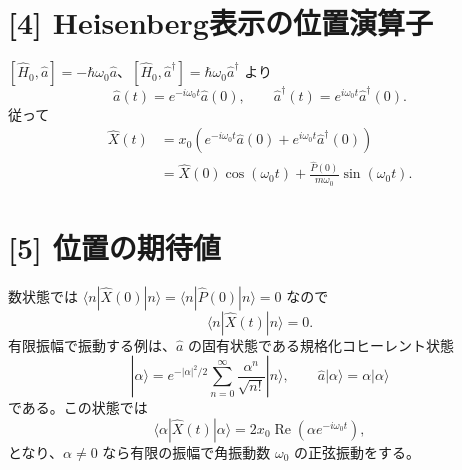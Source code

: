\documentclass[11pt,a4paper]{article}
\begin{document}
\section*{[4] Heisenberg表示の位置演算子}
$[\hat H_0,\hat a]=-\hbar\omega_0\hat a$、$[\hat H_0,\hat a^\dagger]=\hbar\omega_0\hat a^\dagger$ より
\begin{equation}
  \hat a(t)=e^{-i\omega_0t}\hat a(0),\qquad
  \hat a^\dagger(t)=e^{i\omega_0t}\hat a^\dagger(0).
\end{equation}
従って
\begin{align}
  \hat X(t)
  &=x_0\left(e^{-i\omega_0t}\hat a(0)
           +e^{i\omega_0t}\hat a^\dagger(0)\right)\\
  &=\boxed{\hat X(0)\cos(\omega_0t)
      +\frac{\hat P(0)}{m\omega_0}\sin(\omega_0t).}
\end{align}

\section*{[5] 位置の期待値}
数状態では $\langle n|\hat X(0)|n\rangle=\langle n|\hat P(0)|n\rangle=0$ なので
\begin{equation}
  \boxed{\langle n|\hat X(t)|n\rangle=0.}
\end{equation}
有限振幅で振動する例は、$\hat a$ の固有状態である規格化コヒーレント状態
\begin{equation}
  |\alpha\rangle=e^{-|\alpha|^2/2}
  \sum_{n=0}^{\infty}\frac{\alpha^n}{\sqrt{n!}}|n\rangle,
  \qquad \hat a|\alpha\rangle=\alpha|\alpha\rangle
\end{equation}
である。この状態では
\begin{equation}
  \boxed{\langle\alpha|\hat X(t)|\alpha\rangle
  =2x_0\operatorname{Re}\!\left(\alpha e^{-i\omega_0t}\right),}
\end{equation}
となり、$\alpha\ne0$ なら有限の振幅で角振動数 $\omega_0$ の正弦振動をする。
\end{document}
